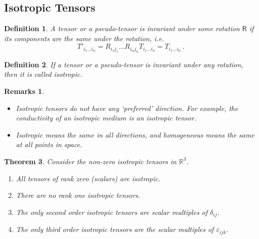 \documentclass{article}
\theoremstyle{plain}\theoremheaderfont{\normalfont\itshape}\theorembodyfont{\rmfamily}\theoremseparator{.}\newtheorem*{rem}{Remark}\newtheorem*{ex}{Example}\newtheorem*{proof}{Proof}\newtheorem*{altp}{Alternative proof}
\theoremstyle{plain}\theoremheaderfont{\normalfont\bfseries}\theorembodyfont{\rmfamily}\theoremseparator{.}\newtheorem{thm}{Theorem}[section]\newtheorem{lem}[thm]{Lemma}\newtheorem{prop}[thm]{Proposition}\newtheorem*{cor}{Corollary}\newtheorem{defn}[thm]{Definition}\newtheorem{clm}[thm]{Claim}\newtheorem{clminproof}{Claim}
\theoremstyle{break}\theoremheaderfont{\normalfont\itshape}\theorembodyfont{\rmfamily}\theoremseparator{.\medskip}\newtheorem*{proofskip}{Proof}\newtheorem*{exs}{Examples}\newtheorem*{rems}{Remarks}
\theoremstyle{break}\theoremheaderfont{\normalfont\bfseries}\theorembodyfont{\rmfamily}\theoremseparator{.\medskip}\newtheorem{lemskip}[thm]{Lemma}\newtheorem{defnskip}[thm]{Definition}\newtheorem{propskip}[thm]{Proposition}\newtheorem{thmskip}[thm]{Theorem}
\numberwithin{equation}{section}
\begin{document}
	\subsection{Isotropic Tensors}
	\begin{defn}
		A tensor or a pseudo-tensor is \textit{invariant} under some rotation \(\mathsf{R}\) if its components are the same under the rotation, i.e.
		\[T'_{i_1\dots i_n}=R_{i_1j_1}\dots R_{i_nj_n}T_{i_1\dots i_n}=T_{i_1\dots i_n}\,.\]
	\end{defn}
	\begin{defn}
		If a tensor or a pseudo-tensor is invariant under any rotation, then it is called \textit{isotropic}.
	\end{defn}
	\begin{rems}
		\begin{itemize}[topsep=0pt]
			\item Isotropic tensors do not have any `preferred' direction. For example, the conductivity of an isotropic medium is an isotropic tensor.
			\item \textit{Isotropic} means the same in all directions, and \textit{homogeneous} means the same at all points in space.
		\end{itemize}
	\end{rems}
	\begin{thm}
		Consider the non-zero isotropic tensors in \(\mathbb{R}^3\).
		\begin{enumerate}[topsep=0pt]
			\item[(i)] All tensors of rank zero (scalars) are isotropic.
			\item[(ii)] There are no rank one isotropic tensors.
			\item[(iii)] The only second order isotropic tensors are scalar multiples of \(\delta_{ij}\).
			\item[(iv)] The only third order isotropic tensors are the scalar multiples of \(\varepsilon_{ijk}\). 
		\end{enumerate}
	\end{thm}
\end{document}
